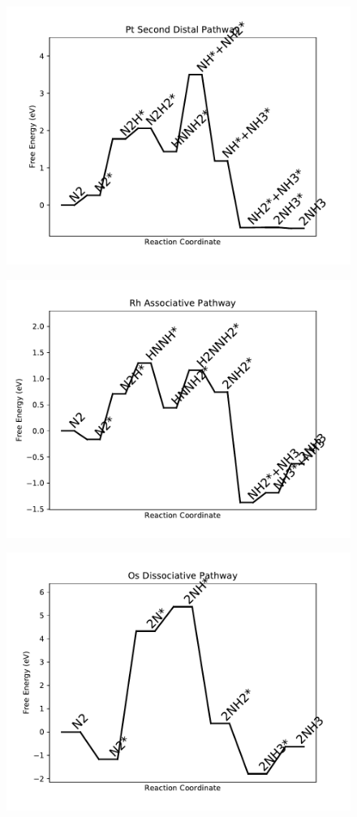 \begin{figure}
\includegraphics[width=0.8\linewidth]{data/plots/Pt_distal_2.pdf}
\label{fig:Pt_distal_2}
\end{figure}

\begin{figure}
\includegraphics[width=0.8\linewidth]{data/plots/Rh_associative.pdf}
\label{fig:Rh_associative}
\end{figure}

\begin{figure}
\includegraphics[width=0.8\linewidth]{data/plots/Os_dissociative.pdf}
\label{fig:Os_dissociative}
\end{figure}

